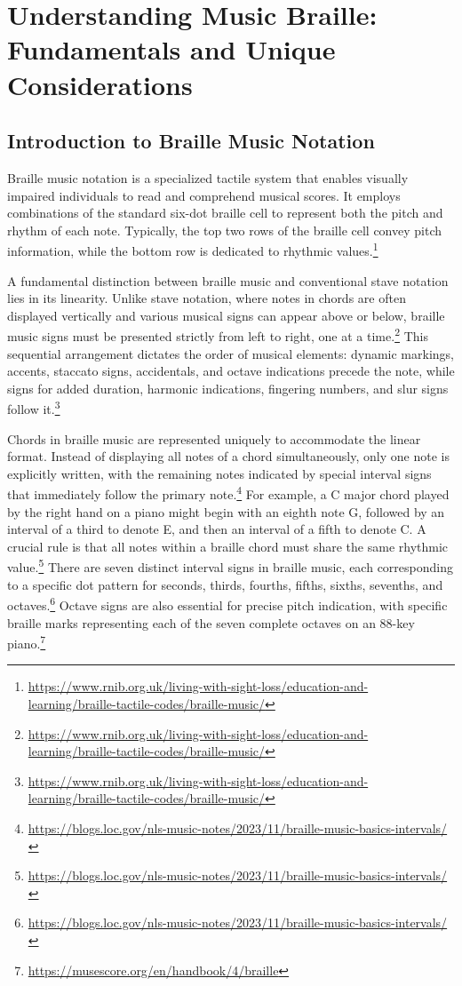 \section{Understanding Music Braille: Fundamentals and Unique Considerations}

\subsection{Introduction to Braille Music Notation}
Braille music notation is a specialized tactile system that enables visually impaired individuals to read and comprehend musical scores. It employs combinations of the standard six-dot braille cell to represent both the pitch and rhythm of each note. Typically, the top two rows of the braille cell convey pitch information, while the bottom row is dedicated to rhythmic values.\footnote{\url{https://www.rnib.org.uk/living-with-sight-loss/education-and-learning/braille-tactile-codes/braille-music/}}

A fundamental distinction between braille music and conventional stave notation lies in its linearity. Unlike stave notation, where notes in chords are often displayed vertically and various musical signs can appear above or below, braille music signs must be presented strictly from left to right, one at a time.\footnote{\url{https://www.rnib.org.uk/living-with-sight-loss/education-and-learning/braille-tactile-codes/braille-music/}} This sequential arrangement dictates the order of musical elements: dynamic markings, accents, staccato signs, accidentals, and octave indications precede the note, while signs for added duration, harmonic indications, fingering numbers, and slur signs follow it.\footnote{\url{https://www.rnib.org.uk/living-with-sight-loss/education-and-learning/braille-tactile-codes/braille-music/}}

Chords in braille music are represented uniquely to accommodate the linear format. Instead of displaying all notes of a chord simultaneously, only one note is explicitly written, with the remaining notes indicated by special interval signs that immediately follow the primary note.\footnote{\url{https://blogs.loc.gov/nls-music-notes/2023/11/braille-music-basics-intervals/}} For example, a C major chord played by the right hand on a piano might begin with an eighth note G, followed by an interval of a third to denote E, and then an interval of a fifth to denote C. A crucial rule is that all notes within a braille chord must share the same rhythmic value.\footnote{\url{https://blogs.loc.gov/nls-music-notes/2023/11/braille-music-basics-intervals/}} There are seven distinct interval signs in braille music, each corresponding to a specific dot pattern for seconds, thirds, fourths, fifths, sixths, sevenths, and octaves.\footnote{\url{https://blogs.loc.gov/nls-music-notes/2023/11/braille-music-basics-intervals/}} Octave signs are also essential for precise pitch indication, with specific braille marks representing each of the seven complete octaves on an 88-key piano.\footnote{\url{https://musescore.org/en/handbook/4/braille}}

